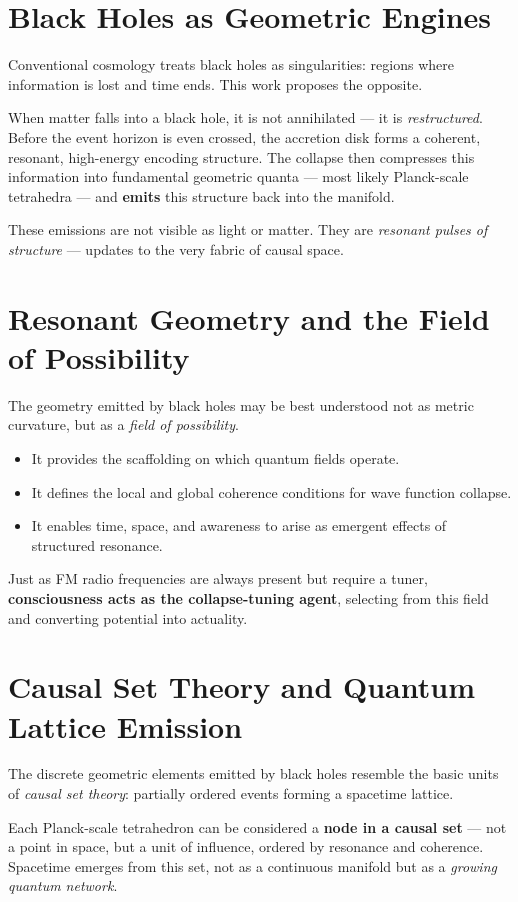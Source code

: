 \documentclass[12pt]{article}
\begin{document}
\section{Black Holes as Geometric Engines}
Conventional cosmology treats black holes as singularities: regions where information is lost and time ends. This work proposes the opposite.

When matter falls into a black hole, it is not annihilated — it is \emph{restructured}. Before the event horizon is even crossed, the accretion disk forms a coherent, resonant, high-energy encoding structure. The collapse then compresses this information into fundamental geometric quanta — most likely Planck-scale tetrahedra — and \textbf{emits} this structure back into the manifold.

These emissions are not visible as light or matter. They are \emph{resonant pulses of structure} — updates to the very fabric of causal space.

\section{Resonant Geometry and the Field of Possibility}
The geometry emitted by black holes may be best understood not as metric curvature, but as a \emph{field of possibility}.

\begin{itemize}[noitemsep,topsep=0.5em]
\item It provides the scaffolding on which quantum fields operate.
\item It defines the local and global coherence conditions for wave function collapse.
\item It enables time, space, and awareness to arise as emergent effects of structured resonance.
\end{itemize}

Just as FM radio frequencies are always present but require a tuner, \textbf{consciousness acts as the collapse-tuning agent}, selecting from this field and converting potential into actuality.

\section{Causal Set Theory and Quantum Lattice Emission}
The discrete geometric elements emitted by black holes resemble the basic units of \emph{causal set theory}: partially ordered events forming a spacetime lattice.

Each Planck-scale tetrahedron can be considered a \textbf{node in a causal set} — not a point in space, but a unit of influence, ordered by resonance and coherence. Spacetime emerges from this set, not as a continuous manifold but as a \emph{growing quantum network}.
\end{document}
